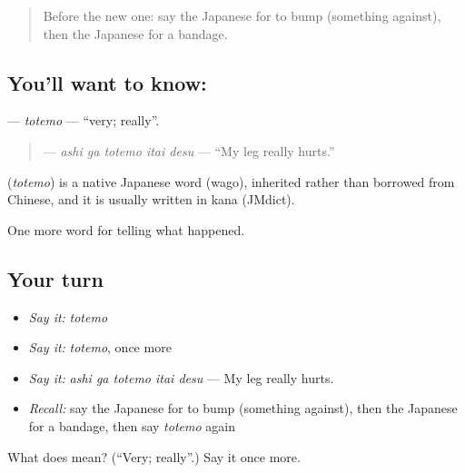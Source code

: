 \label{lesson:JA-C264-totemo}



\begin{quote}
Before the new one: say the Japanese for to bump (something against), then the Japanese for a bandage.
\end{quote}

\subsection*{You'll want to know: }
\textbf{} — \emph{totemo} — \textquotedblleft{}very; really\textquotedblright{}.

\begin{quote}
\textbf{  } — \emph{ashi ga totemo itai desu} — \textquotedblleft{}My leg really hurts.\textquotedblright{}
\end{quote}

\begin{cousinweb}
\textbf{} (\emph{totemo}) is a native Japanese word (wago), inherited rather than borrowed from Chinese, and it is usually written in kana (JMdict).
\end{cousinweb}

\begin{grammarlens}[title={What you've built}]
One more word for telling what happened.
\end{grammarlens}

\subsection*{Your turn}
\begin{itemize}
\raggedright
  \item \emph{Say it:} \emph{totemo}
  \item \emph{Say it:} \emph{totemo}, once more
  \item \emph{Say it:} \emph{ashi ga totemo itai desu} — My leg really hurts.
  \item \emph{Recall:} say the Japanese for to bump (something against), then the Japanese for a bandage, then say \emph{totemo} again
\end{itemize}

\begin{tcolorbox}[breakable,colback=teal!4,colframe=teal!35!black,title={Before you move on}]
What does  mean? (\textquotedblleft{}Very; really\textquotedblright{}.) Say it once more.
\end{tcolorbox}
